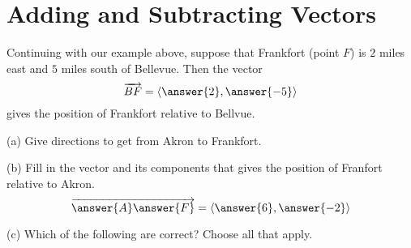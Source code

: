 \documentclass{ximera}
\begin{document}
\section{Adding and Subtracting Vectors}

\begin{question}    \label{Q234234:Vectors}
Continuing with our example above, suppose that Frankfort (point $F$) is $2$ miles east and $5$ miles south of Bellevue. Then the vector
\[
    \overrightarrow{BF}  = \langle \answer{2}, \answer{-5}\rangle
\]
gives the position of Frankfort relative to Bellvue. 
\end{question}

\begin{question} \label{Q233:Vectors}
(a) Give directions to get from Akron to Frankfort.

(b) Fill in the vector and its components that gives the position of Franfort relative to Akron.
\[
       \overrightarrow{\answer{A} \answer{F}}    =  \langle  \answer{6} , \answer{-2}  \rangle 
\]

(c) Which of the following are correct? Choose all that apply.
\begin{selectAll}  
\end{selectAll} 


\end{question}
\end{document}

